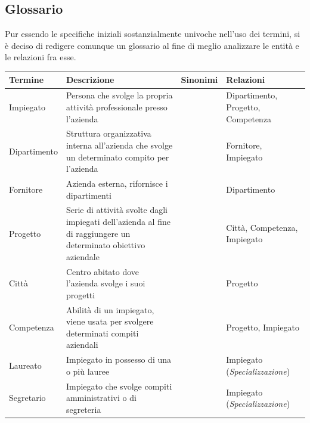 \documentclass{article}
\begin{document}
\subsection{Glossario}
Pur essendo le specifiche iniziali sostanzialmente univoche nell'uso dei termini, si è deciso di redigere comunque un glossario al fine di meglio analizzare le entità e le relazioni fra esse.
\begin{table}[h]
\renewcommand{\arraystretch}{1.5}
\centering
\begin{tabular}{|p{}|p{}|p{}|p{}|}
\hline
\textbf{Termine} & \textbf{Descrizione} & \textbf{Sinonimi} & \textbf{Relazioni}        
\\ \hline
Impiegato & Persona che svolge la propria attività professionale presso l'azienda &   & Dipartimento, Progetto, Competenza
\\ \hline
Dipartimento & Struttura organizzativa interna all'azienda che svolge un determinato compito per l'azienda &  & Fornitore, Impiegato
\\ \hline
Fornitore & Azienda esterna, rifornisce i dipartimenti &  & Dipartimento
\\ \hline
Progetto & Serie di attività svolte dagli impiegati dell'azienda al fine di raggiungere un determinato obiettivo aziendale &    & Città, Competenza, Impiegato
\\ \hline
Città & Centro abitato dove l'azienda svolge i suoi progetti &   & Progetto
\\ \hline
Competenza & Abilità di un impiegato, viene usata per svolgere determinati compiti aziendali &   & Progetto, Impiegato 
\\ \hline
Laureato & Impiegato in possesso di una o più lauree &  & Impiegato (\textit{Specializzazione})
\\ \hline
Segretario & Impiegato che svolge compiti amministrativi o di segreteria & & Impiegato (\textit{Specializzazione})
\\ \hline
\end{tabular}
\end{table}

\newpage
\end{document}
